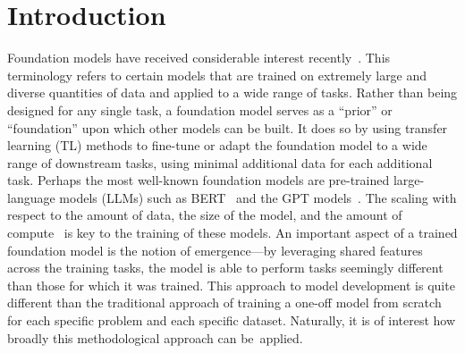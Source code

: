 \section{Introduction}
\label{sec:intro}

Foundation models have received considerable interest recently~\cite{bommasani2021opportunities}.
%
This terminology refers to certain models that are trained on extremely large and diverse quantities of data and applied to a wide range of tasks.
Rather than being designed for any single task,
a foundation model serves as a ``prior'' or ``foundation'' upon which other models can be built.
It does so by using transfer learning (TL) methods to fine-tune or adapt the foundation model to a wide range of downstream tasks, using minimal additional data for each additional task.
%
Perhaps the most well-known foundation models are pre-trained large-language models (LLMs) such as BERT~\cite{devlin2018bert} and the GPT models~\cite{radford2018improving,radford2019language,brown2020language}.
%
The scaling with respect to the amount of data, the size of the model, and the amount of compute~\cite{kaplan2020scaling,henighan2020scaling} is key to the training of these models.
%
An important aspect of a trained foundation model is the notion of emergence---by leveraging shared features across the training tasks, the model is able to perform tasks seemingly different than those for which it was trained.
%
This approach to model development is quite different than the traditional approach of training a one-off model from scratch for each specific problem and each specific dataset.
%
Naturally, it is of interest how broadly this methodological approach can be~applied.

